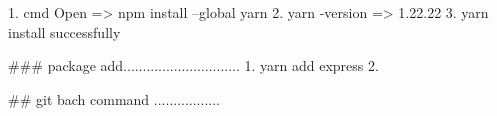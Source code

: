 1. cmd Open => npm install --global yarn
2. yarn -version => 1.22.22
3. yarn install successfully

### package add..............................
1. yarn add express 
2. 

## git bach command .................